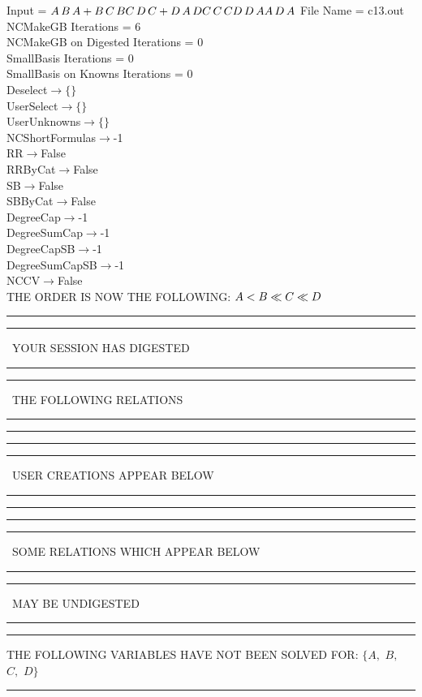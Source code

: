 \documentclass[rep10,leqno]{report}
\begin{document}
\normalsize
\baselineskip=12pt
\noindent
Input = 
$
\\A\,
 B\,
 A + B\,
 C\,
 B\\
C\,
 D\,
 C + D\,
 A\,
 D\\
C\,
 C\,
 C\\
D\,
 D\,
 A\\
A\,
 D\,
 A\\
$
File Name = c13.out\\
NCMakeGB Iterations = 6\\
NCMakeGB on Digested Iterations = 0\\
SmallBasis Iterations = 0\\
SmallBasis on Knowns Iterations = 0\\
Deselect$\rightarrow \{\}$\\
UserSelect$\rightarrow \{\}$\\
UserUnknowns$\rightarrow \{\}$\\
NCShortFormulas$\rightarrow$-1\\
RR$\rightarrow $False\\
RRByCat$\rightarrow $False\\
SB$\rightarrow $False\\
SBByCat$\rightarrow $False\\
DegreeCap$\rightarrow $-1\\
DegreeSumCap$\rightarrow $-1\\
DegreeCapSB$\rightarrow $-1\\
DegreeSumCapSB$\rightarrow $-1\\
NCCV$\rightarrow $False\\
THE ORDER IS NOW THE FOLLOWING:\hfil\break
$
A<B\ll
C\ll
D\\
$
\rule[2pt]{6in}{4pt}\hfil\break
\rule[2pt]{1.879in}{4pt}
\ YOUR SESSION HAS DIGESTED\ 
\rule[2pt]{1.879in}{4pt}\hfil\break
\rule[2pt]{1.923in}{4pt}
\ THE FOLLOWING RELATIONS\ 
\rule[2pt]{1.923in}{4pt}\hfil\break
\rule[2pt]{6in}{4pt}\hfil\break
\rule[2pt]{6in}{1pt}\hfil\break
\rule[2.5pt]{1.701in}{1pt}
\ USER CREATIONS APPEAR BELOW\ 
\rule[2.5pt]{1.701in}{1pt}\hfil\break
\rule[2pt]{6in}{1pt}\hfil\break
\rule[2pt]{6in}{4pt}\hfil\break
\rule[2pt]{1.45in}{4pt}
\ SOME RELATIONS WHICH APPEAR BELOW\ 
\rule[2pt]{1.45in}{4pt}\hfil\break
\rule[2pt]{2.18in}{4pt}
\ MAY BE UNDIGESTED\ 
\rule[2pt]{2.18in}{4pt}\hfil\break
\rule[2pt]{6in}{4pt}\hfil\break
THE FOLLOWING VARIABLES HAVE NOT BEEN SOLVED FOR:\hfil\break
$\{A,
$ $
B,
$ $
C,
$ $
D\}$
\smallskip\\
\rule[3pt]{6in}{.7pt}\\
\end{document}
